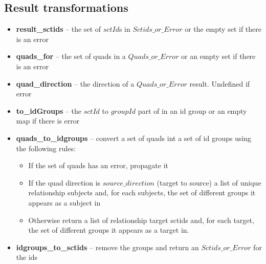\documentclass{article}
\begin{document}
\subsection{Result transformations}
\begin{itemize}[noitemsep,nolistsep]
\item \textbf{result\_sctids} -- the set of $sctId$s in $Sctids\_or\_Error$ or the empty set if there is an error
\item \textbf{quads\_for} -- the set of quads in a $Quads\_or\_Error$ or an empty set if there is an error
\item \textbf{quad\_direction} -- the direction of a $Quads\_or\_Error$ result.  Undefined if error
\item \textbf{to\_idGroups} -- the $sctId$ to $groupId$ part of in an id group or an empty map if there is error
\item \textbf{quads\_to\_idgroups} -- convert a set of quads int a set of id groups using the following rules:
\begin{itemize}[noitemsep,nolistsep]
\item If the set of quads has an error, propagate it
\item If the quad direction is $source\_direction$ (target to source) a list of unique relationship subjects and, for each subjects, the set of different groups it appears as a subject in
\item Otherwise return a list of relationship target sctids and, for each target, the set of different groups it appears as a target in.
\end{itemize}
\item \textbf{idgroups\_to\_sctids} -- remove the groups and return an $Sctids\_or\_Error$ for the ids
\end{itemize}
\end{document}
